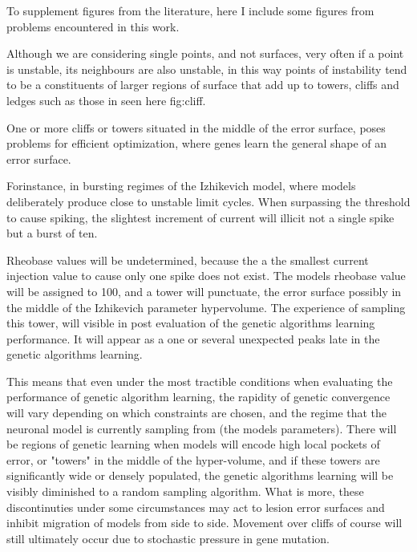 To supplement figures from the literature, here I include some figures from problems encountered in this work.

Although we are considering single points, and not surfaces, very often if a point is unstable, its neighbours are also unstable, in this way points of instability tend to be a constituents of larger regions of surface that add up to towers, cliffs and ledges such as those in seen here {fig:cliff}.

One or more cliffs or towers situated in the middle of the error surface, poses problems for efficient optimization, where genes learn the general shape of an error surface. %


Forinstance, in bursting regimes of the Izhikevich model, where models deliberately produce close to unstable limit cycles. When surpassing the threshold to cause spiking, the slightest increment of current  will illicit not a single spike but a burst of ten.

Rheobase values will be undetermined, because the a the smallest current injection value to cause only one spike does not exist. The models rheobase value will be assigned to 100, and a tower will punctuate, the error surface possibly in the middle of the Izhikevich parameter hypervolume. The experience of sampling this tower, will visible in post evaluation of the genetic algorithms learning performance. It will appear as a one or several unexpected peaks late in the genetic algorithms learning.

This means that even under the most tractible conditions when evaluating the performance of genetic algorithm learning, the rapidity of genetic convergence will vary depending on which constraints are chosen, and the regime that the neuronal model is currently sampling from (the models parameters). There will be regions of genetic learning when models will encode high local pockets of error, or "towers" in the middle of the hyper-volume, and if these towers are significantly wide or densely populated, the genetic algorithms learning will be visibly diminished to a random sampling algorithm. What is more, these discontinuties under some circumstances may act to lesion error surfaces and inhibit migration of models from side to side. Movement over cliffs of course will still ultimately occur due to stochastic pressure in gene mutation.

